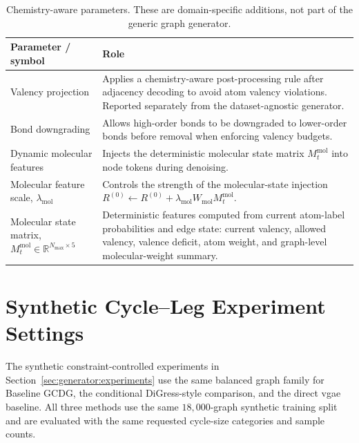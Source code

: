 \begin{table}[p]
\centering
\footnotesize
\begin{tabularx}{\textwidth}{@{}p{}X@{}}
\toprule
Parameter / symbol & Role \\
\midrule
Valency projection & Applies a chemistry-aware post-processing rule after adjacency decoding to avoid atom valency violations. Reported separately from the dataset-agnostic generator. \\
Bond downgrading & Allows high-order bonds to be downgraded to lower-order bonds before removal when enforcing valency budgets. \\
Dynamic molecular features & Injects the deterministic molecular state matrix \(M_t^{\mathrm{mol}}\) into node tokens during denoising. \\
Molecular feature scale, \(\lambda_{\mathrm{mol}}\) & Controls the strength of the molecular-state injection \(R^{(0)}\leftarrow R^{(0)}+\lambda_{\mathrm{mol}}W_{\mathrm{mol}}M_t^{\mathrm{mol}}\). \\
Molecular state matrix, \(M_t^{\mathrm{mol}}\in\mathbb{R}^{N_{\max}\times 5}\) & Deterministic features computed from current atom-label probabilities and edge state: current valency, allowed valency, valence deficit, atom weight, and graph-level molecular-weight summary. \\
\bottomrule
\end{tabularx}
\caption{Chemistry-aware parameters. These are domain-specific additions, not part of the generic graph generator.}
\label{tab:generator-molecular-parameters}
\end{table}

\section{Synthetic Cycle--Leg Experiment Settings}

The synthetic constraint-controlled experiments in
Section~\ref{sec:generator:experiments} use the same balanced graph family for
Baseline GCDG, the conditional DiGress-style comparison, and the direct
\gls{vgae} baseline. All three methods use the same \(18{,}000\)-graph
synthetic training split and are evaluated with the same requested cycle-size
categories and sample counts.

